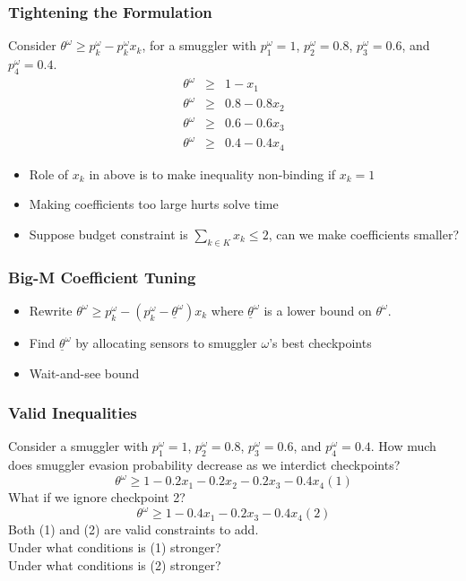 \documentclass[12pt,handout]{beamer}
\begin{document}
\begin{frame}
\frametitle{Tightening the Formulation}
Consider $\theta^\omega \ge p_k^\omega - p_k^\omega x_k$, for a smuggler with $p_1^\omega = 1$, $p_2^\omega = 0.8$, $p_3^\omega = 0.6$, and $p_4^\omega = 0.4$.
\begin{eqnarray}
\theta^\omega &\ge& 1 - x_1 \nonumber \\
\theta^\omega &\ge& 0.8 - 0.8 x_2 \nonumber \\
\theta^\omega &\ge& 0.6 - 0.6 x_3 \nonumber \\
\theta^\omega &\ge& 0.4 - 0.4 x_4 \nonumber
\end{eqnarray}
\begin{itemize}
\item Role of $x_k$ in above is to make inequality non-binding if $x_k = 1$ \\
\item Making coefficients too large hurts solve time \\
\item Suppose budget constraint is $\sum_{k \in K} x_k \le 2$, can we make coefficients smaller?
\end{itemize}
\end{frame}

\begin{frame}
\frametitle{Big-M Coefficient Tuning}
\begin{itemize}
\item Rewrite $\theta^\omega \ge p_k^\omega - (p_k^\omega - \underline{\theta}^\omega) x_k$ where $\underline{\theta}^\omega$ is a lower bound on $\theta^\omega$.
\item Find $\underline{\theta}^\omega$ by allocating sensors to smuggler $\omega$'s best checkpoints
\item Wait-and-see bound
\end{itemize}
\end{frame}

\begin{frame}
\frametitle{Valid Inequalities}
Consider a smuggler with $p_1^\omega = 1$, $p_2^\omega = 0.8$, $p_3^\omega = 0.6$, and $p_4^\omega = 0.4$.
How much does smuggler evasion probability decrease as we interdict checkpoints?
\begin{equation}
\theta^\omega \ge 1 - 0.2 x_1 - 0.2 x_2 - 0.2 x_3 - 0.4 x_4 (1) \nonumber
\end{equation}
What if we ignore checkpoint 2?
\begin{equation}
\theta^\omega \ge 1 - 0.4 x_1 - 0.2 x_3 - 0.4 x_4 (2) \nonumber
\end{equation}
Both (1) and (2) are valid constraints to add. \\
Under what conditions is (1) stronger? \\
Under what conditions is (2) stronger?
\end{frame}
\end{document}

